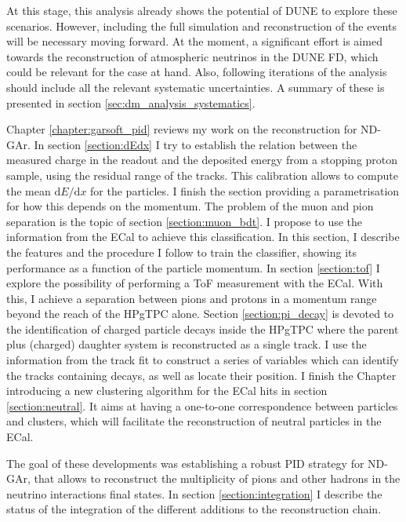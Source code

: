 At this stage, this analysis already shows the potential of DUNE to explore these scenarios. However, including the full simulation and reconstruction of the events will be necessary moving forward. At the moment, a significant effort is aimed towards the reconstruction of atmospheric neutrinos in the DUNE FD, which could be relevant for the case at hand. Also, following iterations of the analysis should include all the relevant systematic uncertainties. A summary of these is presented in section \ref{sec:dm_analysis_systematics}.

Chapter \ref{chapter:garsoft_pid} reviews my work on the reconstruction for ND-GAr. In section \ref{section:dEdx} I try to establish the relation between the measured charge in the readout and the deposited energy from a stopping proton sample, using the residual range of the tracks. This calibration allows to compute the mean $\mathrm{d}E/\mathrm{d}x$ for the particles. I finish the section providing a parametrisation for how this depends on the momentum. The problem of the muon and pion separation is the topic of section \ref{section:muon_bdt}. I propose to use the information from the ECal to achieve this classification. In this section, I describe the features and the procedure I follow to train the classifier, showing its performance as a function of the particle momentum. In section \ref{section:tof} I explore the possibility of performing a ToF measurement with the ECal. With this, I achieve a separation between pions and protons in a momentum range beyond the reach of the HPgTPC alone. Section \ref{section:pi_decay} is devoted to the identification of charged particle decays inside the HPgTPC where the parent plus (charged) daughter system is reconstructed as a single track. I use the information from the track fit to construct a series of variables which can identify the tracks containing decays, as well as locate their position. I finish the Chapter introducing a new clustering algorithm for the ECal hits in section \ref{section:neutral}. It aims at having a one-to-one correspondence between particles and clusters, which will facilitate the reconstruction of neutral particles in the ECal.

The goal of these developments was establishing a robust PID strategy for ND-GAr, that allows to reconstruct the multiplicity of pions and other hadrons in the neutrino interactions final states. In section \ref{section:integration} I describe the status of the integration of the different additions to the reconstruction chain.


